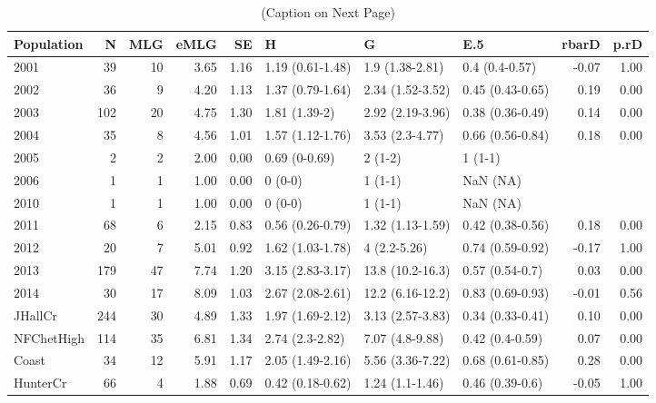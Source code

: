 \documentclass[double,12pt]{beavtex}
\begin{document}
  \begin{table}
  \centering
  \caption[Genotypic diversity metrics or populations of
  textit{Phytophthora ramorum} sampled in Curry County, Oregon between 2001-14
  causing sudden oak death.
  ]{(Caption on Next Page)} 
  \label{tab:ramtabS3}
  \begin{tabular}{lrrrrlllrr}
    \toprule
  Population & N & MLG & eMLG & SE & H & G & E.5 & rbarD & p.rD \\ 
    \midrule
  2001 &  39 &  10 & 3.65 & 1.16 & 1.19 (0.61-1.48) & 1.9 (1.38-2.81) & 0.4 (0.4-0.57) & -0.07 & 1.00 \\ 
    2002 &  36 &   9 & 4.20 & 1.13 & 1.37 (0.79-1.64) & 2.34 (1.52-3.52) & 0.45 (0.43-0.65) & 0.19 & 0.00 \\ 
    2003 & 102 &  20 & 4.75 & 1.30 & 1.81 (1.39-2) & 2.92 (2.19-3.96) & 0.38 (0.36-0.49) & 0.14 & 0.00 \\ 
    2004 &  35 &   8 & 4.56 & 1.01 & 1.57 (1.12-1.76) & 3.53 (2.3-4.77) & 0.66 (0.56-0.84) & 0.18 & 0.00 \\ 
    2005 &   2 &   2 & 2.00 & 0.00 & 0.69 (0-0.69) & 2 (1-2) & 1 (1-1) &  &  \\ 
    2006 &   1 &   1 & 1.00 & 0.00 & 0 (0-0) & 1 (1-1) & NaN (NA) &  &  \\ 
    2010 &   1 &   1 & 1.00 & 0.00 & 0 (0-0) & 1 (1-1) & NaN (NA) &  &  \\ 
    2011 &  68 &   6 & 2.15 & 0.83 & 0.56 (0.26-0.79) & 1.32 (1.13-1.59) & 0.42 (0.38-0.56) & 0.18 & 0.00 \\ 
    2012 &  20 &   7 & 5.01 & 0.92 & 1.62 (1.03-1.78) & 4 (2.2-5.26) & 0.74 (0.59-0.92) & -0.17 & 1.00 \\ 
    2013 & 179 &  47 & 7.74 & 1.20 & 3.15 (2.83-3.17) & 13.8 (10.2-16.3) & 0.57 (0.54-0.7) & 0.03 & 0.00 \\ 
    2014 &  30 &  17 & 8.09 & 1.03 & 2.67 (2.08-2.61) & 12.2 (6.16-12.2) & 0.83 (0.69-0.93) & -0.01 & 0.56 \\ 
    JHallCr & 244 &  30 & 4.89 & 1.33 & 1.97 (1.69-2.12) & 3.13 (2.57-3.83) & 0.34 (0.33-0.41) & 0.10 & 0.00 \\ 
    NFChetHigh & 114 &  35 & 6.81 & 1.34 & 2.74 (2.3-2.82) & 7.07 (4.8-9.88) & 0.42 (0.4-0.59) & 0.07 & 0.00 \\ 
    Coast &  34 &  12 & 5.91 & 1.17 & 2.05 (1.49-2.16) & 5.56 (3.36-7.22) & 0.68 (0.61-0.85) & 0.28 & 0.00 \\ 
    HunterCr &  66 &   4 & 1.88 & 0.69 & 0.42 (0.18-0.62) & 1.24 (1.1-1.46) & 0.46 (0.39-0.6) & -0.05 & 1.00 \\ 

\end{tabular}
\end{table}
\end{document}

